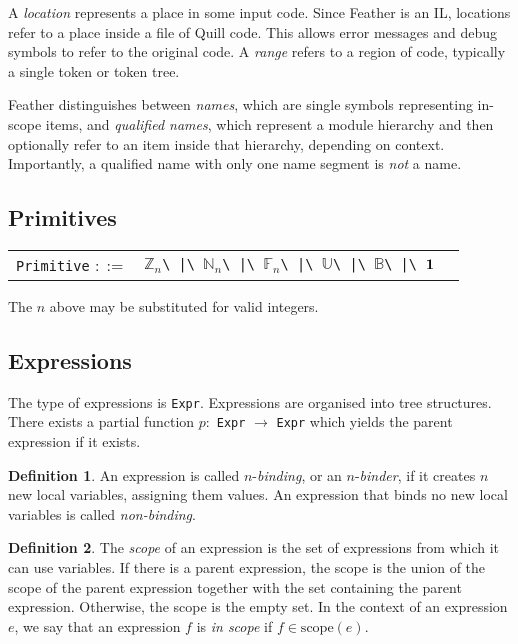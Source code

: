 \documentclass[UKenglish, 11pt, a4paper, parskip=half]{scrbook}
\newcommand{\code}[1]{\lstinline{#1}}
\theoremstyle{definition}
\newtheorem*{definition}{Definition}
\newcommand{\Unit}{{\vb{1}}}
\begin{document}
A \textit{location} represents a place in some input code.
Since Feather is an IL, locations refer to a place inside a file of Quill code.
This allows error messages and debug symbols to refer to the original code.
A \textit{range} refers to a region of code, typically a single token or token tree.

Feather distinguishes between \textit{names}, which are single symbols representing in-scope items, and \textit{qualified names}, which represent a module hierarchy and then optionally refer to an item inside that hierarchy, depending on context.
Importantly, a qualified name with only one name segment is \textit{not} a name.

\subsection{Primitives}

\begin{tabular}{r l p{7cm}}
    \code{Primitive} \( ::= \) & \( \mathbb Z_{n} \)\code{\ |\ }\( \mathbb N_{n} \)\code{\ |\ }\( \mathbb F_{n} \)\code{\ |\ }\( \mathbb U \)\code{\ |\ }\( \mathbb B \)\code{\ |\ }\( \Unit \)
\end{tabular}

The \( n \) above may be substituted for valid integers.

\subsection{Expressions}

The type of expressions is \code{Expr}.
Expressions are organised into tree structures.
There exists a partial function \( p \colon \) \code{Expr} \( \to \) \code{Expr} which yields the parent expression if it exists.

\begin{definition}
    An expression is called \( n \)-\textit{binding}, or an \( n \)-\textit{binder}, if it creates \( n \) new local variables, assigning them values.
    An expression that binds no new local variables is called \textit{non-binding}.
\end{definition}

\begin{definition}
    The \textit{scope} of an expression is the set of expressions from which it can use variables.
    If there is a parent expression, the scope is the union of the scope of the parent expression together with the set containing the parent expression.
    Otherwise, the scope is the empty set.
    In the context of an expression \( e \), we say that an expression \( f \) is \textit{in scope} if \( f \in \mathrm{scope}(e) \).
\end{definition}
\end{document}
